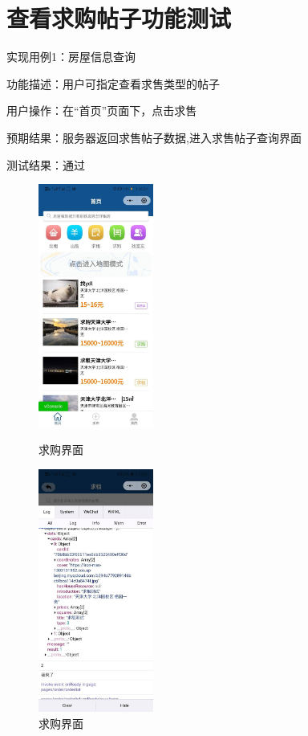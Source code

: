 \section{查看求购帖子功能测试}
实现用例1：房屋信息查询

功能描述：用户可指定查看求售类型的帖子

用户操作：在“首页”页面下，点击求售

预期结果：服务器返回求售帖子数据,进入求售帖子查询界面

测试结果：通过
\newpage
\begin{figure}[htbp]
    \centering
    \begin{minipage}[t]{0.32\textwidth}
        \centering
        \includegraphics[width=3.8cm,height=8cm]{test/image/test13.png} 
       \caption{求购界面} 
        \end{minipage}
    \begin{minipage}[t]{0.32\textwidth}
    \centering
    \includegraphics[width=3.8cm,height=8cm]{test/image/test14.png} 
   \caption{求购界面} 
    \end{minipage}

\end{figure}
